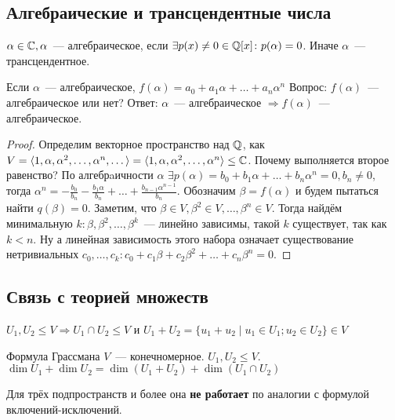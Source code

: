 \subsection{Алгебраические и трансцендентные числа}
\begin{definition}
$\alpha\in\mathbb{C}, \alpha$~--- алгебраическое, если $\exists p(x)\not=0\in\mathbb{Q}[x] \colon p(\alpha)=0$.
Иначе $\alpha$~--- трансцендентное.
\end{definition}
Если $\alpha$~--- алгебраическое, $f(\alpha) = a_0 + a_1\alpha + \dots + a_n\alpha^n$
Вопрос: $f(\alpha)$~--- алгебраическое или нет?
Ответ:
$\alpha$~--- алгебраическое $\Rightarrow f(\alpha)$~--- алгебраическое.
\begin{proof}
    Определим векторное пространство над $\mathbb{Q}$, как $V = \langle1, \alpha, \alpha^2,\dots,\alpha^n,\dots\rangle = \langle1, \alpha, \alpha^2,\dots,\alpha^n\rangle \le \mathbb{C}$.
    Почему выполняется второе равенство?
    По алгебрaичности $\alpha$ $\exists p(\alpha) = b_0+b_1\alpha+\dots+b_n\alpha^n = 0, b_n\not=0$, тогда
    $\alpha^n = -\frac{b_0}{b_n} - \frac{b_1\alpha}{b_n} + \dots + \frac{b_{n-1}\alpha^{n-1}}{b_n}$.
    Обозначим $\beta = f(\alpha)$ и будем пытаться найти $q(\beta)=0$.
    Заметим, что $\beta\in V, \beta^2\in V,\dots,\beta^n\in V$. 
    Тогда найдём минимальную $k: \beta,\beta^2,\dots,\beta^k$~--- линейно зависимы, такой $k$ существует, так как $k < n$. Ну а линейная зависимость этого набора означает существование нетривиальных 
    $c_0,\dots, c_k\colon c_0 + c_1\beta + c_2\beta^2 + \dots + c_n\beta^n=0$.
\end{proof}
\subsection{Связь с теорией множеств}
\begin{definition}
    $U_1, U_2\leq V \Rightarrow U_1\cap U_2 \leq V$ и $U_1+U_2 =
    \{u_1+u_2\mid u_1\in U_1; u_2\in U_2\}\in V$
\end{definition}
\begin{theorem}{Формула Грассмана}
$V$~--- конечномерное. $U_1, U_2\leq V$. 
$\dim U_1 + \dim U_2 = \dim(U_1+U_2) + \dim(U_1\cap U_2)$
\end{theorem}
\begin{remark}
Для трёх подпространств и более она \textbf{не работает} по аналогии с формулой включений-исключений.
\end{remark}
